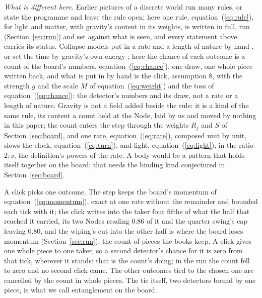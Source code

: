 \documentclass[pdflatex,sn-mathphys-num]{sn-jnl}
\begin{document}
\textit{What is different here.} Earlier pictures of a discrete world \cite{zuse1969,fredkin1990,wolfram2002,thooft2016} run many rules, or state the programme and leave the rule open; here one rule, equation~(\ref{eq:rule}), for light and matter, with gravity's content in its weights, is written in full, run (Section~\ref{sec:run}) and set against what is seen, and every statement above carries its status. Collapse models put in a rate and a length of nature by hand \cite{grw1986}, or set the time by gravity's own energy \cite{penrose1996}; here the chance of each outcome is a count of the board's numbers, equation~(\ref{eq:chance}), one draw, one whole piece written back, and what is put in by hand is the click, assumption 8, with the strength $g$ and the scale $M$ of equation~(\ref{eq:weight}) and the toss of equation~(\ref{eq:chance}): the detector's numbers and its draw, not a rate or a length of nature. Gravity is not a field added beside the rule: it is a kind of the same rule, its content a count held at the Node, laid by us and moved by nothing in this paper; the count enters the step through the weights $R_j$ and $S$ of Section~\ref{sec:board}, and one rate, equation~(\ref{eq:rate}), composed unit by unit, slows the clock, equation~(\ref{eq:turn}), and light, equation~(\ref{eq:light}), in the ratio $2 : s$, the definition's powers of the rate. A body would be a pattern that holds itself together on the board; that needs the binding kind conjectured in Section~\ref{sec:board}.

A click picks one outcome. The step keeps the board's momentum of equation~(\ref{eq:momentum}), exact at one rate without the remainder and bounded each tick with it; the click writes into the taker four fifths of what the half that reached it carried, its two Nodes reading 0.86 of it and the quarter swing's cap leaving 0.80, and the wiping's cut into the other half is where the board loses momentum (Section~\ref{sec:run}); the count of pieces the books keep. A click gives one whole piece to one taker, so a second detector's chance for it is zero from that tick, wherever it stands: that is the count's doing; in the run the count fell to zero and no second click came. The other outcomes tied to the chosen one are cancelled by the count in whole pieces. The tie itself, two detectors bound by one piece, is what we call entanglement on the board.

\vspace{-6pt}
\end{document}
